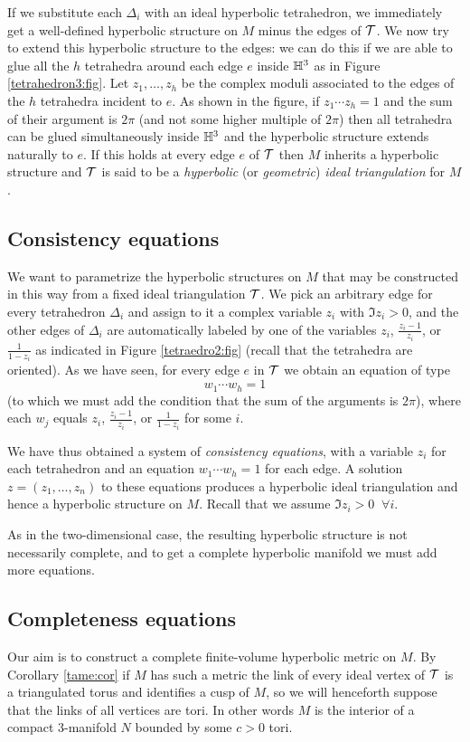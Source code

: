 If we substitute each $\Delta_i$ with an ideal hyperbolic tetrahedron, we immediately get a well-defined hyperbolic structure on $M$ minus the edges of $\mathcal{T}$.
We now try to extend this hyperbolic structure to the edges: we can do this if we are able to glue all the $h$ tetrahedra around each edge $e$ inside $\mathbb{H}^3$ as in Figure \ref{tetrahedron3:fig}. Let $z_1,\ldots, z_h$ be the complex moduli associated to the edges of the $h$ tetrahedra incident to $e$. As shown in the figure, if $z_1\cdots z_h = 1$ and the sum of their argument is $2\pi$ (and not some higher multiple of $2\pi$) then all tetrahedra can be glued simultaneously inside $\mathbb{H}^3$ and the hyperbolic structure extends naturally to $e$. If this holds at every edge $e$ of $\mathcal{T}$ then  $M$ inherits a hyperbolic structure and $\mathcal{T}$ is said to be a \emph{hyperbolic} (or \emph{geometric}) \emph{ideal triangulation} for $M$.

\subsection{Consistency equations}
We want to parametrize the hyperbolic structures on $M$ that may be constructed in this way from a fixed ideal triangulation $\mathcal{T}$. We pick an arbitrary edge for every tetrahedron $\Delta_i$ and assign to it a complex variable $z_i$ with $\Im z_i>0$, and the other edges of $\Delta_i$ are automatically labeled by one of the variables $z_i$, $\frac{z_i-1}{z_i}$, or $\frac 1{1-z_i}$ as indicated in Figure \ref{tetraedro2:fig} (recall that the tetrahedra are oriented). As we have seen, for every edge $e$ in $\mathcal{T}$ we obtain an equation of type 
$$w_1\cdots w_h = 1$$ 
(to which we must add the condition that the sum of the arguments is $2\pi$), where each $w_j$ equals $z_i$, $\frac{z_i-1}{z_i}$, or $\frac 1{1-z_i}$ for some $i$.

We have thus obtained a system of \emph{consistency equations}, with a variable $z_i$ for each tetrahedron and an equation $w_1\cdots w_h = 1$ for each edge. A solution $z = (z_1,\ldots, z_n)$ to these equations produces a hyperbolic ideal triangulation and hence a hyperbolic structure on $M$. Recall that we assume $\Im z_i>0$ $\ \forall i$.

As in the two-dimensional case, the resulting hyperbolic structure is not necessarily complete, and to get a complete hyperbolic manifold we must add more equations.

\subsection{Completeness equations} \label{complete:solutions:subsection}
Our aim is to construct a complete finite-volume hyperbolic metric on $M$. By Corollary \ref{tame:cor} if $M$ has such a metric the link of every ideal vertex of $\mathcal{T}$ is a triangulated torus and identifies a cusp of $M$, so we will henceforth suppose that the links of all vertices are tori. In other words $M$ is the interior of a compact 3-manifold $N$ bounded by some $c>0$ tori.

